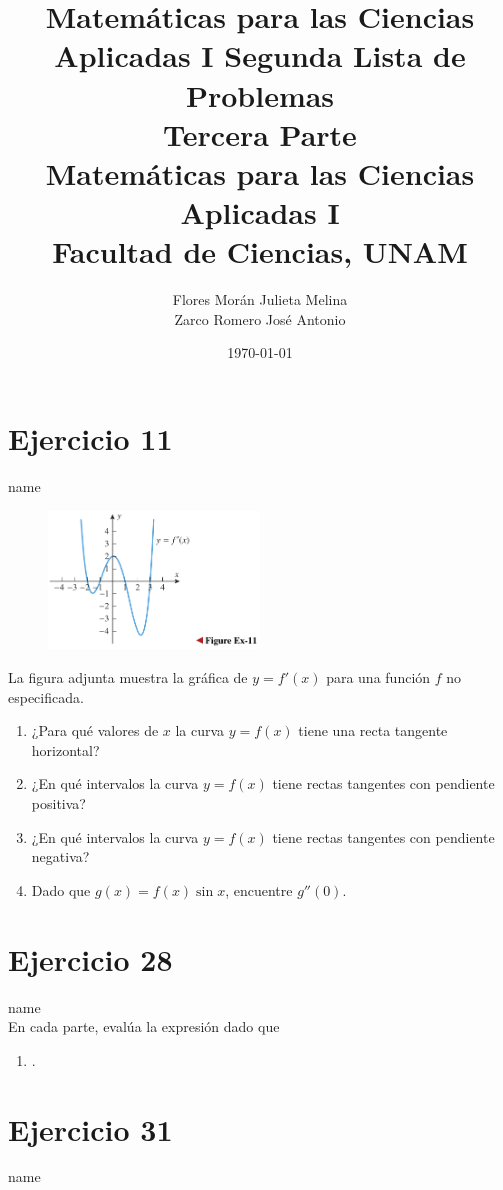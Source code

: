 \documentclass[12pt]{article}
\title{Matemáticas para las Ciencias Aplicadas I}
\title{
	Segunda Lista de Problemas \\
	\textbf{Tercera  Parte} \\
	\vspace{1ex}
	\large Matemáticas para las Ciencias Aplicadas I \\
	Facultad de Ciencias, UNAM}
\date{\today}
\author{Flores Morán Julieta Melina \\ Zarco Romero José Antonio}
\begin{document}
\maketitle


\section{Ejercicio 11} name \\

\begin{figure}[h!]
\centering
\includegraphics[width=0.5\textwidth]{../img/img_Lista2/3_11.png}
\end{figure}
La figura adjunta muestra la gráfica de $y = f'(x)$ para una función $f$ no especificada.
\begin{enumerate}[label=(\alph*)]
\item ¿Para qué valores de $x$ la curva $y = f(x)$ tiene una recta tangente horizontal?
\item ¿En qué intervalos la curva $y = f(x)$ tiene rectas tangentes con pendiente positiva?
\item ¿En qué intervalos la curva $y = f(x)$ tiene rectas tangentes con pendiente negativa?
\item Dado que $g(x) = f(x) \sin x$, encuentre $g''(0)$.
\end{enumerate}

\section{Ejercicio 28} name \\

En cada parte, evalúa la expresión dado que 
\begin{enumerate}[label=(\alph*)]
\item .
\end{enumerate}

\section{Ejercicio 31} name \\
\end{document}
